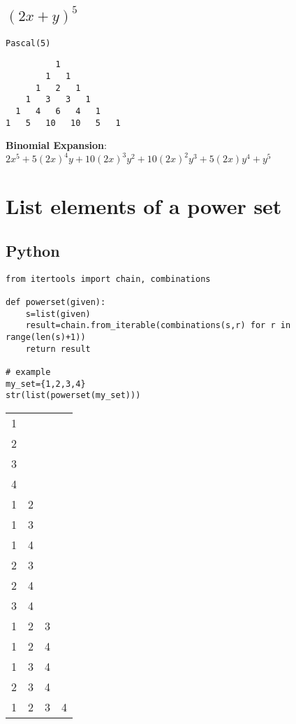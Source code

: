 \documentclass[11pt]{article}
\begin{document}
\subsection{\((2x+y)^5\)}
\label{sec:org30ec46f}
\begin{verbatim}
Pascal(5)
\end{verbatim}

\begin{verbatim}
          1   
        1   1   
      1   2   1   
    1   3   3   1   
  1   4   6   4   1   
1   5   10   10   5   1   
\end{verbatim}


\textbf{Binomial Expansion}:
\(2x^{5}+5(2x)^{4}y+10(2x)^{3}y^{2}+10(2x)^{2}y^{3}+5(2x)y^{4}+y^{5}\)

\section{List elements of a power set}
\label{sec:org9c7ac69}

\subsection{Python}
\label{sec:org0c932de}
\begin{verbatim}
from itertools import chain, combinations

def powerset(given):
    s=list(given)
    result=chain.from_iterable(combinations(s,r) for r in range(len(s)+1))
    return result

# example
my_set={1,2,3,4}
str(list(powerset(my_set)))
\end{verbatim}

\begin{center}
\begin{tabular}{rrll}
1 &  &  & \\[0pt]
2 &  &  & \\[0pt]
3 &  &  & \\[0pt]
4 &  &  & \\[0pt]
1 & 2 &  & \\[0pt]
1 & 3 &  & \\[0pt]
1 & 4 &  & \\[0pt]
2 & 3 &  & \\[0pt]
2 & 4 &  & \\[0pt]
3 & 4 &  & \\[0pt]
1 & 2 & 3 & \\[0pt]
1 & 2 & 4 & \\[0pt]
1 & 3 & 4 & \\[0pt]
2 & 3 & 4 & \\[0pt]
1 & 2 & 3 & 4\\[0pt]
\end{tabular}
\end{center}
\end{document}

